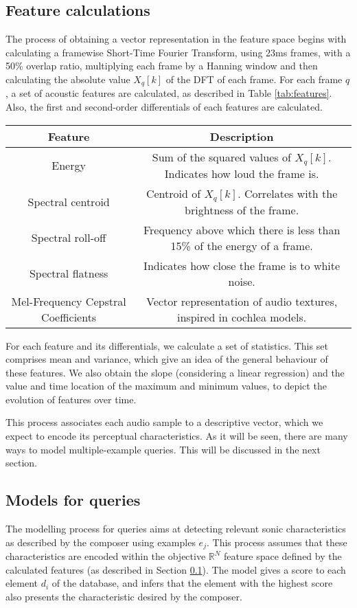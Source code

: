 \documentclass{article}
\begin{document}
\subsection{Feature calculations}\label{sec:features}
The process of obtaining a vector representation in the feature
space begins with calculating a framewise Short-Time Fourier Transform, using 23ms
frames, with a 50\% overlap ratio, multiplying each frame by a Hanning
window and then calculating the absolute value $X_q[k]$ of the DFT of
each frame. For each frame $q$, a set of acoustic features are calculated, as described in
Table \ref{tab:features}. Also, the first and second-order
differentials of each features are calculated.
\begin{table*}
\centering
\caption{Brief description of acoustic features}
\begin{tabular}{|c|c|} \hline
Feature & Description \\ \hline \hline
Energy & Sum of the squared values of $X_q[k]$. Indicates how loud the frame is. \\
Spectral centroid & Centroid of $X_q[k]$. Correlates with the brightness
of the frame. \\
Spectral roll-off & Frequency above which there is less than 15\% of
the energy of a frame. \\
Spectral flatness & Indicates how close the frame is to white
noise. \\
Mel-Frequency Cepstral Coefficients & Vector representation
of audio textures, inspired in cochlea models. \\ \hline
\end{tabular}
\label{tab:features}
\end{table*}

For each feature and its differentials, we calculate a set of
statistics. This set comprises mean and variance, which give an idea
of the general behaviour of these features. We also obtain the slope
(considering a linear regression) and the value and time location of
the maximum and minimum values, to depict the
evolution of features over time.

This process associates each audio sample to a descriptive vector,
which we expect to encode its perceptual characteristics. As it will
be seen, there are many ways to model multiple-example queries. This
will be discussed in the next section.

\subsection{Models for queries}\label{sec:queries}
The modelling process for queries aims at detecting relevant sonic
characteristics as described by the composer using examples
$e_j$. This process assumes that these characteristics are encoded within the
objective $\mathbb{R}^N$ feature space defined by the calculated
features (as described in Section \ref{sec:features}). The model gives
a score to each element $d_i$ of the database, and infers that the element
with the highest score also presents the characteristic desired by the
composer.
\end{document}
